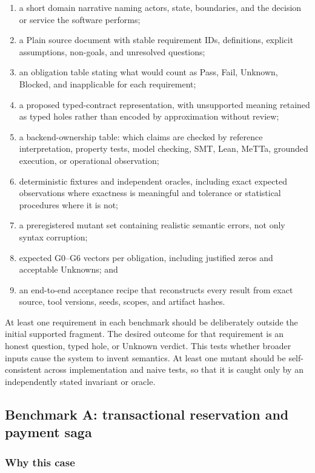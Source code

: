 \documentclass[11pt]{article}
\begin{document}
\begin{enumerate}
\item a short domain narrative naming actors, state, boundaries, and the
      decision or service the software performs;
\item a Plain source document with stable requirement IDs, definitions,
      explicit assumptions, non-goals, and unresolved questions;
\item an obligation table stating what would count as Pass, Fail, Unknown,
      Blocked, and inapplicable for each requirement;
\item a proposed typed-contract representation, with unsupported meaning
      retained as typed holes rather than encoded by approximation without
      review;
\item a backend-ownership table: which claims are checked by reference
      interpretation, property tests, model checking, SMT, Lean, MeTTa,
      grounded execution, or operational observation;
\item deterministic fixtures and independent oracles, including exact
      expected observations where exactness is meaningful and tolerance or
      statistical procedures where it is not;
\item a preregistered mutant set containing realistic semantic errors, not
      only syntax corruption;
\item expected G0--G6 vectors per obligation, including justified zeros and
      acceptable Unknowns; and
\item an end-to-end acceptance recipe that reconstructs every result from
      exact source, tool versions, seeds, scopes, and artifact hashes.
\end{enumerate}

At least one requirement in each benchmark should be deliberately outside the
initial supported fragment.  The desired outcome for that requirement is an
honest question, typed hole, or Unknown verdict.  This tests whether broader
inputs cause the system to invent semantics.  At least one mutant should be
self-consistent across implementation and naive tests, so that it is caught
only by an independently stated invariant or oracle.

\subsection{Benchmark A: transactional reservation and payment saga}

\subsubsection*{Why this case}
\end{document}
